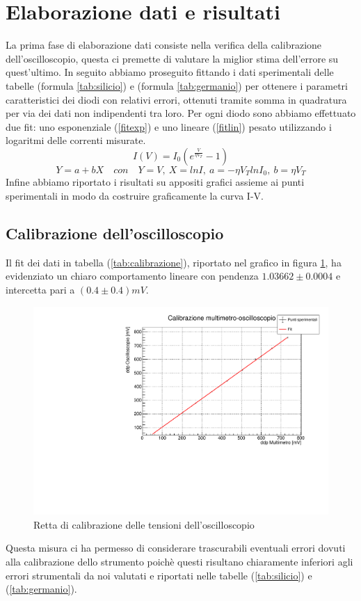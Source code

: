 \documentclass[]{article}
\begin{document}
\section{Elaborazione dati e risultati}

La prima fase di elaborazione dati consiste nella verifica della calibrazione dell'oscilloscopio, questa ci premette di valutare la miglior stima dell'errore su quest'ultimo. In seguito abbiamo proseguito fittando i dati sperimentali delle tabelle (formula \ref{tab:silicio}) e (formula \ref{tab:germanio}) per ottenere i parametri caratteristici dei diodi con relativi errori, ottenuti tramite somma in quadratura per via dei dati non indipendenti tra loro. Per ogni diodo sono abbiamo effettuato due fit: uno esponenziale (\ref{fitexp}) e uno lineare (\ref{fitlin}) pesato utilizzando i logaritmi delle correnti misurate.
\begin{equation}
	I(V)=I_0(e^{\frac{V}{\eta V_T}}-1)
	\label{fitexp}
\end{equation}
\begin{equation}
	Y=a+bX \quad con\quad Y=V,\: X=lnI, \:a=-\eta V_{T}lnI_{0},\: b=\eta V_{T}%
	\label{fitlin}
\end{equation}
Infine abbiamo riportato i risultati su appositi grafici assieme ai punti sperimentali in modo da costruire graficamente la curva I-V. 
  \subsection{Calibrazione dell'oscilloscopio}
Il fit dei dati in tabella (\ref{tab:calibrazione}), riportato nel grafico in figura \ref{fig:calibrazione}, ha evidenziato un chiaro comportamento lineare con pendenza $1.03662\pm0.0004$ e intercetta pari a $(0.4\pm0.4)mV$.
\begin{figure}[H]
	\centering
	\includegraphics[width=0.6\linewidth]{../Silicio/Calibrazione}
	\caption{Retta di calibrazione delle tensioni dell'oscilloscopio}
	\label{fig:calibrazione}
\end{figure}
Questa misura ci ha permesso di considerare trascurabili eventuali errori dovuti alla calibrazione dello strumento poichè questi risultano chiaramente inferiori agli errori strumentali da noi valutati e riportati nelle tabelle (\ref{tab:silicio}) e (\ref{tab:germanio}).
\end{document}

